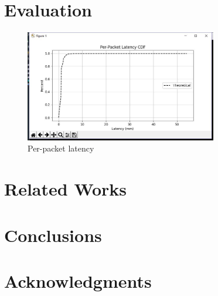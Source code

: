 \documentclass{sig-alternate-10pt}
\begin{document}
\section{Evaluation}

\begin{figure}[t]
\label{cdf}
\centering
\includegraphics[width=3.3in]{cdf.jpg}
\caption{Per-packet latency}
\end{figure}


\section{Related Works}
\section{Conclusions}


\section{Acknowledgments}
\end{document}
